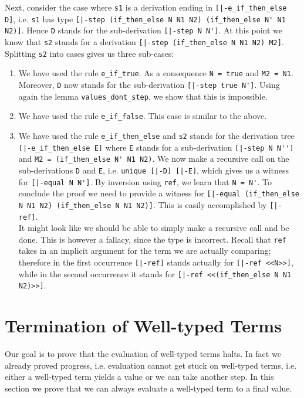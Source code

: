 Next, consider the case where \lstinline!s1! is a derivation ending in
\lstinline![|-e_if_then_else D]!, i.e. \lstinline!s1! has type
\lstinline![|-step (if_then_else N N1 N2) (if_then_else N' N1 N2)]!. Hence \lstinline!D! stands for the sub-derivation
\lstinline![|-step N N']!. At this point we know that \lstinline!s2! stands
for a derivation \lstinline![|-step (if_then_else N N1 N2) M2]!. Splitting
\lstinline!s2! into cases gives us three sub-cases:

\begin{enumerate}
\item We have used the rule \lstinline!e_if_true!. As a consequence
  \lstinline!N = true! and \lstinline!M2 = N1!. Moreover,
  \lstinline!D! now stands for the sub-derivation \lstinline![|-step true N']!.
  Using again the lemma \lstinline!values_dont_step!, we show that this is impossible.

\item We have used the rule \lstinline!e_if_false!. This case is
  similar to the above.

\item We have used the rule \lstinline!e_if_then_else! and
  \lstinline!s2! stands for the derivation tree
\mbox{\lstinline![|-e_if_then_else E]!} where \lstinline!E! stands for a sub-derivation
\lstinline![|-step N N'']! and \lstinline!M2 = (if_then_else N' N1 N2)!.
We now make a recursive call on the sub-derivations \lstinline!D! and
\lstinline!E!, i.e. \lstinline!unique [|-D] [|-E]!, which gives us a
witness for
\mbox{\lstinline![|-equal N N']!}. By inversion using \lstinline!ref!, we learn that
\lstinline!N = N'!. To conclude the proof we need to provide a witness for
\lstinline![|-equal (if_then_else N N1 N2) (if_then_else N N1 N2)]!. This is easily
accomplished by \lstinline![|-ref]!. \\[0.5em]
It might look like we should be able to simply make a recursive call
and be done. This is
however a fallacy, since the type is incorrect. Recall that \lstinline!ref!
takes in an implicit argument for the term we are actually comparing; therefore
in the first occurrence \lstinline![|-ref]! stands actually for
\lstinline![|-ref <<N>>]!, while in the second occurrence it %
stands for \lstinline![|-ref <<(if_then_else N N1 N2)>>]!.
\end{enumerate}


\section{Termination of Well-typed Terms}
Our goal is to prove that the evaluation of well-typed terms halts. In
fact we already proved progress, i.e. evaluation cannot get stuck on
well-typed terms, i.e. either a well-typed term yields a value or we
can take another step. In this section we prove that we can always
evaluate a well-typed term to a final value.

